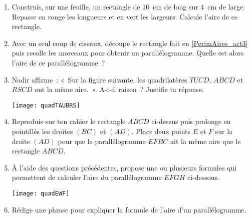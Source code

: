 
\begin{activite}

\begin{enumerate} \label{PerimAires_act3}
\item Construis, sur une feuille, un rectangle de 10 cm de long sur 4 cm de large. Repasse en rouge les longueurs et en vert les largeurs. Calcule l'aire de ce rectangle.


\item Avec un seul coup de ciseaux, découpe le rectangle fait en \ref{PerimAires_act3} puis recolle les morceaux pour obtenir un parallélogramme. Quelle est alors l’aire de ce parallélogramme ?



\item Nadir affirme : « Sur la figure suivante, les quadrilatères $TUCD$, $ABCD$ et $RSCD$ ont la même aire. ». A-t-il raison ? Justifie ta réponse.\\[0.5em]
\begin{center} \texttt{[image: quadTAUBRS]} \end{center}


\item Reproduis sur ton cahier le rectangle $ABCD$ ci-dessus puis prolonge en pointillés les droites $(BC)$ et $(AD)$. Place deux points $E$ et $F$ sur la droite $(AD)$ pour que le parallélogramme $EFBC$ ait la même aire que le rectangle $ABCD$.



\item À l'aide des questions précédentes, propose une ou plusieurs formules qui permettent de calculer l'aire du parallélogramme $EFGH$ ci-dessous.
 
\begin{center}
\texttt{[image: quadEWF]}
\end{center}


\item Rédige une phrase pour expliquer la formule de l'aire d'un parallélogramme.
\end{enumerate}

\end{activite}


